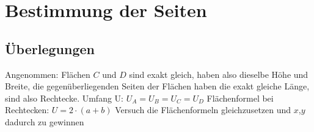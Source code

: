 \documentclass[a4paper, 11pt, ngerman, twocolumn]{article}
\begin{document}
	\section{Bestimmung der Seiten}
	\subsection{Überlegungen}
		\begin{flushleft}
			Angenommen: Flächen $C$ und $D$ sind exakt gleich, haben also dieselbe
			Höhe und Breite, die gegenüberliegenden Seiten der Flächen
			haben die exakt gleiche Länge, sind also Rechtecke. \break
			\break
			Umfang U: $U_A = U_B = U_C = U_D$ \break
			Flächenformel bei Rechtecken: $U = 2 \cdot (a + b )$ \break
			Versuch die Flächenformeln gleichzusetzen und $x$,$y$ dadurch zu gewinnen \break
		\end{flushleft}
\end{document}
